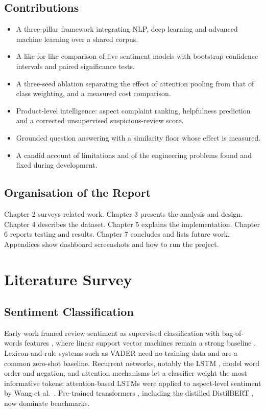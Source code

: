 \documentclass[12pt,a4paper]{report}
\begin{document}
\section{Contributions}
\begin{itemize}
\item A three-pillar framework integrating NLP, deep learning and advanced machine learning over a shared corpus.
\item A like-for-like comparison of five sentiment models with bootstrap confidence intervals and paired significance tests.
\item A three-seed ablation separating the effect of attention pooling from that of class weighting, and a measured cost comparison.
\item Product-level intelligence: aspect complaint ranking, helpfulness prediction and a corrected unsupervised suspicious-review score.
\item Grounded question answering with a similarity floor whose effect is measured.
\item A candid account of limitations and of the engineering problems found and fixed during development.
\end{itemize}

\section{Organisation of the Report}
Chapter 2 surveys related work. Chapter 3 presents the analysis and design. Chapter 4 describes the dataset. Chapter 5 explains the implementation. Chapter 6 reports testing and results. Chapter 7 concludes and lists future work. Appendices show dashboard screenshots and how to run the project.

\chapter{Literature Survey}
\section{Sentiment Classification}
Early work framed review sentiment as supervised classification with bag-of-words features \cite{pang2002thumbs}, where linear support vector machines remain a strong baseline \cite{joachims1998text}. Lexicon-and-rule systems such as VADER \cite{hutto2014vader} need no training data and are a common zero-shot baseline. Recurrent networks, notably the LSTM \cite{hochreiter1997lstm}, model word order and negation, and attention mechanisms \cite{bahdanau2015attention} let a classifier weight the most informative tokens; attention-based LSTMs were applied to aspect-level sentiment by Wang et al.\ \cite{wang2016attention}. Pre-trained transformers \cite{devlin2019bert}, including the distilled DistilBERT \cite{sanh2019distilbert}, now dominate benchmarks.
\end{document}
